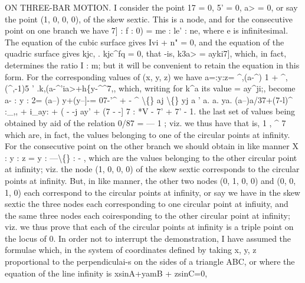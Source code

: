\documentclass[11pt,a4paper]{book}
\begin{document}
ON THREE-BAR MOTION.
I
consider
the
point
17 = 0,
5' = 0,
a> = 0,
or
say
the
point
(1,
0,
0,
0),
of
the
skew
sextic.
This
is
a
node,
and
for
the
consecutive
point
on
one
branch
we
have
7]
:
f
:
0) = me
:
le'
:
ne,
where
e
is
infinitesimal.
The
equation
of
the
cubic
surface
gives
Ivi + n" = 0, and
the
equation
of
the
quadric
surface
gives
kjc,
.
kjc\textasciicircum{}fq = 0,
that
-is,
k3a> = ayki7],
which,
in
fact,
determines
the
ratio
I
: m;
but
it
will
be
convenient
to
retain
the
equation
in
this
form.
For
the
corresponding
values
of
(x,
y, z) we have
a=:y:z=
\textasciicircum{}\textbullet{},(a-\textasciicircum{}) 1 + \textasciicircum{},(\textasciicircum{},-1)5
'
.k,(a-\textasciicircum{}'ia>+h\{y-\textasciicircum{}\textasciicircum{}7,,
which, writing
for k\textasciicircum{}a
its value = ay\textasciicircum{}ji;, become
a-
: y
: 2=
(a--)
y+(y--]-=
07-'\textasciicircum{} + -
\textasciicircum{}
\textbackslash\{\}
aj
\textbackslash\{\}
yj a
'
a.
a.
ya.
(a--)a/37+(7-l)\textasciicircum{}
:\_,, + i\_ay: + \guillemotleft{}
(
\guillemotleft{} - -j
ay' + (7 - -] 7
: *V - 7' + 7' - 1.
the
last
set
of
values
being
obtained
by
aid
of
the
relation
0/87 = --- 1
;
viz.
we
thus have
that
is,
1
,
\textasciicircum{}
7
which
are,
in
fact,
the
values
belonging
to
one
of
the
circular
points
at
infinity.
For
the
consecutive
point
on
the
other
branch
we
should
obtain
in
like
manner
X
: y
: z = y
: ---\textbackslash\{\}
: -
,
which
are
the
values
belonging
to
the
other
circular
point
at
infinity;
viz.
the
node
(1,
0,
0,
0)
of
the
skew
sextic
corresponds
to
the
circular
points at
infinity.
But,
in
like manner, the
other two nodes
(0,
1,
0, 0) and
(0,
0,
1, 0)
each
correspond
to
the
circular
points
at
infinity,
or
say we
have
in
the skew
sextic
the
three
nodes
each
corresponding
to
one
circular
point
at
infiuity,
and
the
same
three
nodes
each
coiresponding
to
the
other
circular
point
at
infinity;
viz.
we
thus
prove that each
of the circular points at
infinity
is a
triple point on
the
locus of 0.
In
order
not
to
interrupt
the
demonstration,
I
have assumed
the
formulae
which,
in
the system
of
coordinates defined by taking
x, y, z proportional
to
the
perpendiculai-s
on
the
sides
of a
triangle ABC,
or
where
the
equation
of
the
line
infinity
is
xsinA+yamB + zsinC=0,
\end{document}
